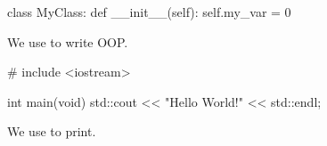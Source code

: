 \documentclass[12pt]{article}
\begin{document}
\begin{python}
class MyClass:
    def __init__(self):
        self.my_var = 0
\end{python}

We use  to write OOP.

\begin{cpp}
# include <iostream>

int main(void)
{
    std::cout << "Hello World!" << std::endl;
}
\end{cpp}

We use  to print.
\end{document}

